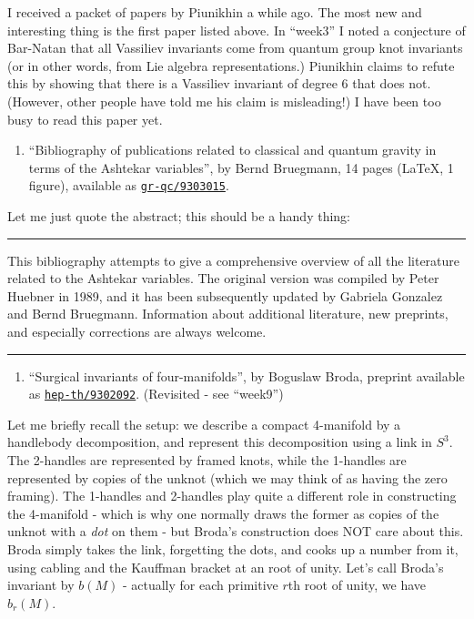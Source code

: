 \documentclass{article}
\def\tightlist{}
\begin{document}
I received a packet of papers by Piunikhin a while ago. The most new and
interesting thing is the first paper listed above. In ``week3'' I noted
a conjecture of Bar-Natan that all Vassiliev invariants come from
quantum group knot invariants (or in other words, from Lie algebra
representations.) Piunikhin claims to refute this by showing that there
is a Vassiliev invariant of degree 6 that does not. (However, other
people have told me his claim is misleading!) I have been too busy to
read this paper yet.

\begin{enumerate}
\def\labelenumi{\arabic{enumi})}
\setcounter{enumi}{2}
\tightlist
\item
  ``Bibliography of publications related to classical and quantum
  gravity in terms of the Ashtekar variables'', by Bernd Bruegmann, 14
  pages (LaTeX, 1 figure), available as
  \href{http://xxx.lanl.gov/abs/gr-qc/9303015}{\texttt{gr-qc/9303015}}.
\end{enumerate}

Let me just quote the abstract; this should be a handy thing:

\begin{center}\rule{0.5\linewidth}{0.5pt}\end{center}

This bibliography attempts to give a comprehensive overview of all the
literature related to the Ashtekar variables. The original version was
compiled by Peter Huebner in 1989, and it has been subsequently updated
by Gabriela Gonzalez and Bernd Bruegmann. Information about additional
literature, new preprints, and especially corrections are always
welcome.

\begin{center}\rule{0.5\linewidth}{0.5pt}\end{center}

\begin{enumerate}
\def\labelenumi{\arabic{enumi})}
\setcounter{enumi}{3}
\tightlist
\item
  ``Surgical invariants of four-manifolds'', by Boguslaw Broda, preprint
  available as
  \href{http://xxx.lanl.gov/ps/hep-th/9302092}{\texttt{hep-th/9302092}}.
  (Revisited - see ``week9'')
\end{enumerate}

Let me briefly recall the setup: we describe a compact 4-manifold by a
handlebody decomposition, and represent this decomposition using a link
in \(S^3\). The 2-handles are represented by framed knots, while the
1-handles are represented by copies of the unknot (which we may think of
as having the zero framing). The 1-handles and 2-handles play quite a
different role in constructing the 4-manifold - which is why one
normally draws the former as copies of the unknot with a \emph{dot} on
them - but Broda's construction does NOT care about this. Broda simply
takes the link, forgetting the dots, and cooks up a number from it,
using cabling and the Kauffman bracket at an root of unity. Let's call
Broda's invariant by \(b(M)\) - actually for each primitive \(r\)th root
of unity, we have \(b_r(M)\).
\end{document}
